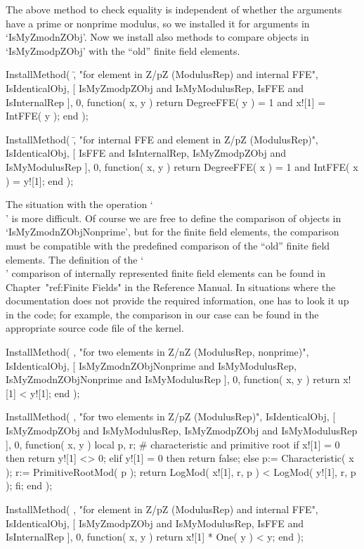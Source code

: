 The above method to check equality is independent of whether the
arguments have a prime or nonprime modulus,
so we installed it for arguments in `IsMyZmodnZObj'.
Now we install also methods to compare objects in `IsMyZmodpZObj'
with the ``old'' finite field elements.

\begintt
InstallMethod( \=,
    "for element in Z/pZ (ModulusRep) and internal FFE",
    IsIdenticalObj,
    [ IsMyZmodpZObj and IsMyModulusRep, IsFFE and IsInternalRep ], 0,
    function( x, y )
    return DegreeFFE( y ) = 1 and x![1] = IntFFE( y );
    end );

InstallMethod( \=,
    "for internal FFE and element in Z/pZ (ModulusRep)",
    IsIdenticalObj,
    [ IsFFE and IsInternalRep, IsMyZmodpZObj and IsMyModulusRep ], 0,
    function( x, y )
    return DegreeFFE( x ) = 1 and IntFFE( x ) = y![1];
    end );
\endtt

The situation with the operation `\\\<' is more difficult.
Of course we are free to define the comparison of objects in
`IsMyZmodnZObjNonprime',
but for the finite field elements, the comparison must be compatible
with the predefined comparison of the ``old'' finite field elements.
The definition of the `\\\<' comparison of internally represented
finite field elements can be found in Chapter~"ref:Finite Fields"
in the Reference Manual.
In situations where the documentation does not provide the required
information, one has to look it up in the {\GAP} code;
for example, the comparison in our case can be found in the
appropriate source code file of the {\GAP} kernel.

\begintt
InstallMethod( \<,
    "for two elements in Z/nZ (ModulusRep, nonprime)",
    IsIdenticalObj,
    [ IsMyZmodnZObjNonprime and IsMyModulusRep,
      IsMyZmodnZObjNonprime and IsMyModulusRep ], 0,
    function( x, y ) return x![1] < y![1]; end );

InstallMethod( \<,
    "for two elements in Z/pZ (ModulusRep)",
    IsIdenticalObj,
    [ IsMyZmodpZObj and IsMyModulusRep,
      IsMyZmodpZObj and IsMyModulusRep ], 0,
    function( x, y )
    local p, r;      # characteristic and primitive root
    if x![1] = 0 then
      return y![1] <> 0;
    elif y![1] = 0 then
      return false;
    else
      p:= Characteristic( x );
      r:= PrimitiveRootMod( p );
      return LogMod( x![1], r, p ) < LogMod( y![1], r, p );
    fi;
    end );

InstallMethod( \<,
    "for element in Z/pZ (ModulusRep) and internal FFE",
    IsIdenticalObj,
    [ IsMyZmodpZObj and IsMyModulusRep, IsFFE and IsInternalRep ], 0,
    function( x, y )
    return x![1] * One( y ) < y;
    end );

